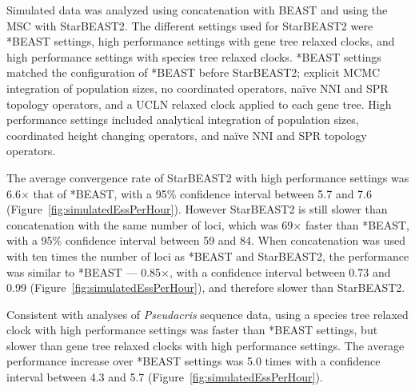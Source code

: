 \documentclass[nogrid]{MBE}%
\begin{document}
Simulated data was analyzed using concatenation with BEAST and using the MSC with
StarBEAST2. The different settings used for StarBEAST2 were *BEAST settings,
high performance settings with gene tree relaxed clocks, and high performance settings with
species tree relaxed clocks. *BEAST settings matched the configuration of *BEAST
before StarBEAST2; explicit MCMC integration of population sizes, no
coordinated operators, na\"ive NNI and SPR topology operators, and a UCLN
relaxed clock applied to each gene tree. High performance settings included analytical
integration of population sizes, coordinated height changing operators, and
na\"ive NNI and SPR topology operators.

The average convergence rate of StarBEAST2 with high performance settings
was 6.6$\times$ that of *BEAST, with a 95\% confidence interval between
5.7 and 7.6 (Figure~\ref{fig:simulatedEssPerHour}). However StarBEAST2 is still
slower than concatenation with the same number of loci, which was 69$\times$
faster than *BEAST, with a 95\% confidence interval between 59 and 84. When
concatenation was used with ten times the number of loci as *BEAST and StarBEAST2, the
performance was similar to *BEAST --- 0.85$\times$, with a confidence interval
between 0.73 and 0.99 (Figure~\ref{fig:simulatedEssPerHour}), and therefore
slower than StarBEAST2.

Consistent with analyses of \textit{Pseudacris} sequence data, using a species
tree relaxed clock with high performance settings was faster than *BEAST settings, but slower than
gene tree relaxed clocks with high performance settings. The average performance
increase over *BEAST settings was 5.0 times with a confidence interval
between 4.3 and 5.7 (Figure~\ref{fig:simulatedEssPerHour}).
\end{document}
